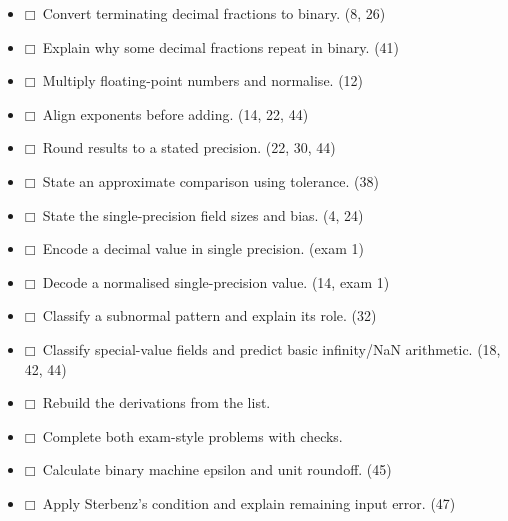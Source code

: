 \documentclass[11pt]{article}
\begin{document}
\begin{keepsection}
\begin{itemize}
\item $\mdlgwhtsquare$\  Convert terminating decimal fractions to binary. (8, 26)
\item $\mdlgwhtsquare$\  Explain why some decimal fractions repeat in binary. (41)
\item $\mdlgwhtsquare$\  Multiply floating-point numbers and normalise. (12)
\item $\mdlgwhtsquare$\  Align exponents before adding. (14, 22, 44)
\item $\mdlgwhtsquare$\  Round results to a stated precision. (22, 30, 44)
\item $\mdlgwhtsquare$\  State an approximate comparison using tolerance. (38)
\item $\mdlgwhtsquare$\  State the single-precision field sizes and bias. (4, 24)
\item $\mdlgwhtsquare$\  Encode a decimal value in single precision. (exam 1)
\item $\mdlgwhtsquare$\  Decode a normalised single-precision value. (14, exam 1)
\item $\mdlgwhtsquare$\  Classify a subnormal pattern and explain its role. (32)
\item $\mdlgwhtsquare$\  Classify special-value fields and predict basic infinity/NaN arithmetic. (18, 42, 44)
\item $\mdlgwhtsquare$\  Rebuild the derivations from the list.
\item $\mdlgwhtsquare$\  Complete both exam-style problems with checks.
\item $\mdlgwhtsquare$\  Calculate binary machine epsilon and unit roundoff. (45)
\item $\mdlgwhtsquare$\  Apply Sterbenz’s condition and explain remaining input error. (47)
\end{itemize}
\end{keepsection}


\clearpage
\end{document}
